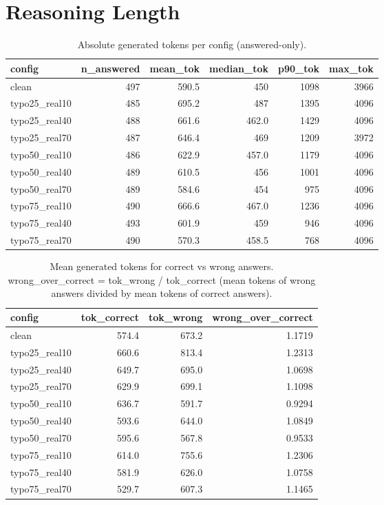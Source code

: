 \documentclass[11pt]{article}
\begin{document}
\section*{Reasoning Length}
\begin{table}[H]
\centering
\caption{Absolute generated tokens per config (answered-only).}
\small
\begin{adjustbox}{max width=\textwidth}
\begin{tabular}{lrrrrr}
\toprule
\textbf{config} & \textbf{n\_answered} & \textbf{mean\_tok} & \textbf{median\_tok} & \textbf{p90\_tok} & \textbf{max\_tok} \\
\midrule
clean & 497 & 590.5 & 450 & 1098 & 3966 \\
typo25\_real10 & 485 & 695.2 & 487 & 1395 & 4096 \\
typo25\_real40 & 488 & 661.6 & 462.0 & 1429 & 4096 \\
typo25\_real70 & 487 & 646.4 & 469 & 1209 & 3972 \\
typo50\_real10 & 486 & 622.9 & 457.0 & 1179 & 4096 \\
typo50\_real40 & 489 & 610.5 & 456 & 1001 & 4096 \\
typo50\_real70 & 489 & 584.6 & 454 & 975 & 4096 \\
typo75\_real10 & 490 & 666.6 & 467.0 & 1236 & 4096 \\
typo75\_real40 & 493 & 601.9 & 459 & 946 & 4096 \\
typo75\_real70 & 490 & 570.3 & 458.5 & 768 & 4096 \\
\bottomrule
\end{tabular}
\end{adjustbox}
\end{table}

\begin{table}[H]
\centering
\caption{Mean generated tokens for correct vs wrong answers. wrong\_over\_correct = tok\_wrong / tok\_correct (mean tokens of wrong answers divided by mean tokens of correct answers).}
\small
\begin{adjustbox}{max width=\textwidth}
\begin{tabular}{lrrr}
\toprule
\textbf{config} & \textbf{tok\_correct} & \textbf{tok\_wrong} & \textbf{wrong\_over\_correct} \\
\midrule
clean & 574.4 & 673.2 & 1.1719 \\
typo25\_real10 & 660.6 & 813.4 & 1.2313 \\
typo25\_real40 & 649.7 & 695.0 & 1.0698 \\
typo25\_real70 & 629.9 & 699.1 & 1.1098 \\
typo50\_real10 & 636.7 & 591.7 & 0.9294 \\
typo50\_real40 & 593.6 & 644.0 & 1.0849 \\
typo50\_real70 & 595.6 & 567.8 & 0.9533 \\
typo75\_real10 & 614.0 & 755.6 & 1.2306 \\
typo75\_real40 & 581.9 & 626.0 & 1.0758 \\
typo75\_real70 & 529.7 & 607.3 & 1.1465 \\
\bottomrule
\end{tabular}
\end{adjustbox}
\end{table}
\end{document}
